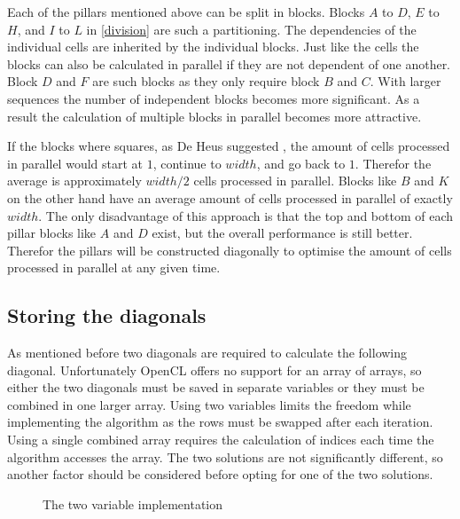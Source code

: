 Each of the pillars mentioned above can be split in blocks.
Blocks $A$ to $D$, $E$ to $H$, and $I$ to $L$ in \cref{division} are such a partitioning.
The dependencies of the individual cells are inherited by the individual blocks.
Just like the cells the blocks can also be calculated in parallel if they are not dependent of one another.
Block $D$ and $F$ are such blocks as they only require block $B$ and $C$.
With larger sequences the number of independent blocks becomes more significant.
As a result the calculation of multiple blocks in parallel becomes more attractive.

If the blocks where squares, as De Heus suggested \cite{Heus}, the amount of cells processed in parallel would start at $1$, continue to $width$, and go back to $1$.
Therefor the average is approximately $width/2$ cells processed in parallel.
Blocks like $B$ and $K$ on the other hand have an average amount of cells processed in parallel of exactly $width$.
The only disadvantage of this approach is that the top and bottom of each pillar blocks like $A$ and $D$ exist, but the overall performance is still better.
Therefor the pillars will be constructed diagonally to optimise the amount of cells processed in parallel at any given time.

\subsection{Storing the diagonals} \label{section:diagonal}
As mentioned before two diagonals are required to calculate the following diagonal.
Unfortunately OpenCL offers no support for an array of arrays, so either the two diagonals must be saved in separate variables or they must be combined in one larger array.
Using two variables limits the freedom while implementing the algorithm as the rows must be swapped after each iteration.
Using a single combined array requires the calculation of indices each time the algorithm accesses the array.
The two solutions are not significantly different, so another factor should be considered before opting for one of the two solutions.

\begin{figure}[p]
    \centering
    \subfloat[][Input]{\label{twovarsinput}}
    \subfloat[][Output]{\label{twovarsoutput}}
    \caption{The two variable implementation} \label{twovars}
\end{figure}

